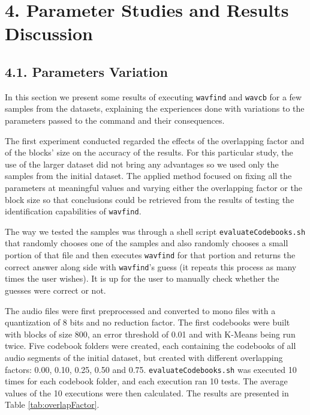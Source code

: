 \documentclass[12pt]{article}
\begin{document}
\section*{4. Parameter Studies and Results Discussion}
\subsection*{4.1. Parameters Variation}

In this section we present some results of executing \texttt{wavfind} and \texttt{wavcb} for a few samples
from the datasets, explaining the experiences done with variations to the 
parameters passed to the command and their consequences.

The first experiment conducted regarded the effects of the overlapping factor 
and of the blocks' size on the accuracy of the results.
For this particular study, the use of the larger dataset did not bring any 
advantages so we used only the samples from the initial dataset.
The applied method focused on fixing all the parameters at meaningful values and
varying either the overlapping factor or the block size so that conclusions 
could be retrieved from the results of testing the identification capabilities 
of \texttt{wavfind}.

The way we tested the samples was through a shell script \texttt{evaluateCodebooks.sh}
that randomly chooses one of the samples and also randomly chooses a small portion
of that file and then executes \texttt{wavfind} for that portion and returns
the correct answer along side with \texttt{wavfind}'s guess (it repeats this process as 
many times the user wishes). 
It is up for the user to manually check whether the guesses were correct or not.

The audio files were first preprocessed and converted to mono files with a 
quantization of 8 bits and no reduction factor.
The first codebooks were built with blocks of size 800, an error threshold of 
0.01 and with K-Means being run twice.
Five codebook folders were created, each containing the codebooks of all audio
segments of the initial dataset, but created with different overlapping factors:
0.00, 0.10, 0.25, 0.50 and 0.75. 
\texttt{evaluateCodebooks.sh} was executed 10 times for each codebook folder,
and each execution ran 10 tests.
The average values of the 10 executions were then calculated.
The results are presented in Table \ref{tab:overlapFactor}.
\end{document}
